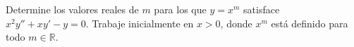 Determine los valores reales de $m$ para los que $y=x^m$ satisface $x^2y''+xy'-y=0$. Trabaje inicialmente en $x>0$, donde $x^m$ está definido para todo $m\in\mathbb R$.

